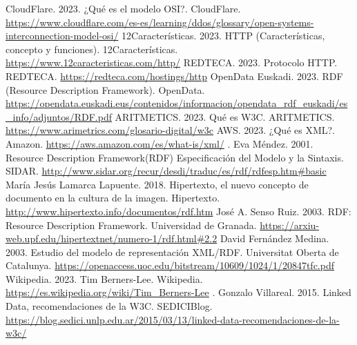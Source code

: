 \documentclass[11pt]{report}
\begin{document}
	\begin{thebibliography}{99}
	 CloudFlare. 2023.  ¿Qué es el modelo OSI?.  CloudFlare.  \url{https://www.cloudflare.com/es-es/learning/ddos/glossary/open-systems-interconnection-model-osi/}
	 12Características. 2023. HTTP (Características, concepto y funciones). 12Características. \url{https://www.12caracteristicas.com/http/}
	 REDTECA. 2023. Protocolo HTTP. REDTECA. \url{https://redteca.com/hostings/http}
	OpenData Euskadi. 2023. RDF (Resource Description Framework). OpenData. \url{https://opendata.euskadi.eus/contenidos/informacion/opendata_rdf_euskadi/es_info/adjuntos/RDF.pdf}
	 ARITMETICS. 2023. Qué es W3C. ARITMETICS. \url{https://www.arimetrics.com/glosario-digital/w3c}
	 AWS. 2023. ¿Qué es XML?. Amazon. \url{https://aws.amazon.com/es/what-is/xml/}
	.  Eva Méndez. 2001. Resource Description Framework(RDF)	Especificación del Modelo y la Sintaxis. SIDAR. \url{http://www.sidar.org/recur/desdi/traduc/es/rdf/rdfesp.htm#basic}
	 María Jesús Lamarca Lapuente. 2018. Hipertexto, el nuevo concepto de documento en la cultura de la imagen. Hipertexto. \url{http://www.hipertexto.info/documentos/rdf.htm}
	 José A. Senso Ruiz. 2003. RDF: Resource Description Framework. Universidad de Granada. \url{https://arxiu-web.upf.edu/hipertextnet/numero-1/rdf.html#2.2}
	 David Fernández Medina. 2003. Estudio del modelo de representación XML/RDF. Universitat Oberta de Catalunya. \url{https://openaccess.uoc.edu/bitstream/10609/1024/1/20847tfc.pdf}
	 Wikipedia. 2023. Tim Berners-Lee. Wikipedia. \url{https://es.wikipedia.org/wiki/Tim_Berners-Lee}
	. Gonzalo Villareal. 2015. Linked Data, recomendaciones de la W3C. SEDICIBlog. \url{https://blog.sedici.unlp.edu.ar/2015/03/13/linked-data-recomendaciones-de-la-w3c/}
	\end{thebibliography}

	
\end{document}
